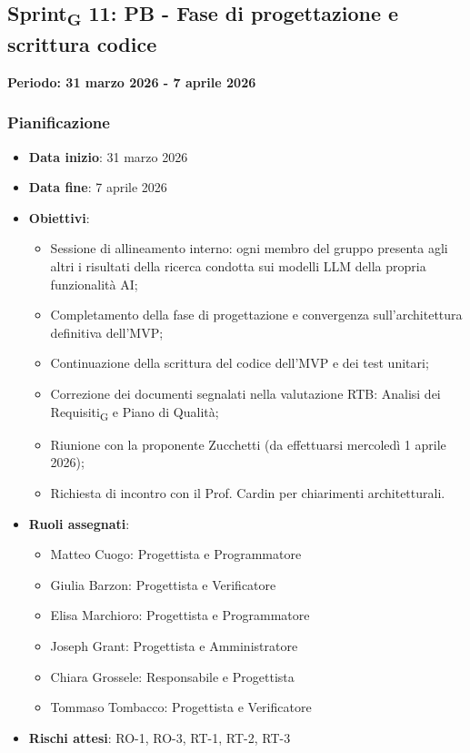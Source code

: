\documentclass[11pt,a4paper]{article}
\newcommand{\gls}[1]{#1\textsubscript{G}}
\begin{document}
\newpage

\subsection{\gls{Sprint} 11: PB - Fase di progettazione e scrittura codice}
{\textbf{Periodo: 31 marzo 2026 - 7 aprile 2026}\par}

\subsubsection{Pianificazione}
\begin{itemize}
    \item \textbf{Data inizio}: 31 marzo 2026
    \item \textbf{Data fine}: 7 aprile 2026
        \item \textbf{Obiettivi}:
    \begin{itemize}
        \item Sessione di allineamento interno: ogni membro del gruppo presenta agli altri i risultati della ricerca condotta sui modelli LLM della propria funzionalità AI;
        \item Completamento della fase di progettazione e convergenza sull'architettura definitiva dell'MVP;
        \item Continuazione della scrittura del codice dell'MVP e dei test unitari;
        \item Correzione dei documenti segnalati nella valutazione RTB: \gls{Analisi dei Requisiti} e Piano di Qualità;
        \item Riunione con la proponente Zucchetti (da effettuarsi mercoledì 1 aprile 2026);
        \item Richiesta di incontro con il Prof. Cardin per chiarimenti architetturali.
    \end{itemize}
    
    \item \textbf{Ruoli assegnati}:
    \begin{itemize}
        \item Matteo Cuogo: Progettista e Programmatore
        \item Giulia Barzon: Progettista e Verificatore
        \item Elisa Marchioro: Progettista e Programmatore
        \item Joseph Grant: Progettista e Amministratore
        \item Chiara Grossele: Responsabile e Progettista
        \item Tommaso Tombacco: Progettista e Verificatore
    \end{itemize}
    \item \textbf{Rischi attesi}: RO-1, RO-3, RT-1, RT-2, RT-3
\end{itemize}
\end{document}
